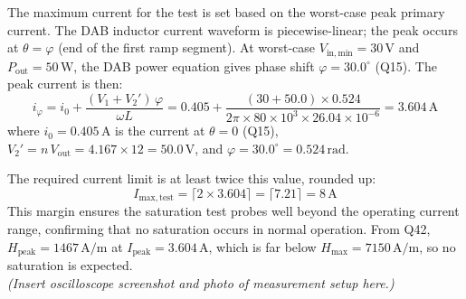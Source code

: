 \documentclass{PELsmallreport}
\begin{document}
\begin{framed}
The maximum current for the test is set based on the worst-case peak primary current. The DAB inductor current waveform is piecewise-linear; the peak occurs at $\theta = \varphi$ (end of the first ramp segment). At worst-case $V_\mathrm{in,min} = 30\,\mathrm{V}$ and $P_\mathrm{out} = 50\,\mathrm{W}$, the DAB power equation gives phase shift $\varphi = 30.0^\circ$ (Q15). The peak current is then:
\begin{equation}
    i_\varphi = i_0 + \frac{(V_1 + V_2')\,\varphi}{\omega L} = 0.405 + \frac{(30 + 50.0)\times0.524}{2\pi\times80\times10^3\times26.04\times10^{-6}} = 3.604\,\mathrm{A}
\end{equation}
where $i_0 = 0.405\,\mathrm{A}$ is the current at $\theta=0$ (Q15), $V_2' = n\,V_\mathrm{out} = 4.167\times12 = 50.0\,\mathrm{V}$, and $\varphi = 30.0^\circ = 0.524\,\mathrm{rad}$.

The required current limit is at least twice this value, rounded up:
\begin{equation}
    I_\mathrm{max,test} = \lceil 2 \times 3.604 \rceil = \lceil 7.21 \rceil = 8\,\mathrm{A}
\end{equation}
This margin ensures the saturation test probes well beyond the operating current range, confirming that no saturation occurs in normal operation. From Q42, $H_\mathrm{peak} = 1467\,\mathrm{A/m}$ at $I_\mathrm{peak} = 3.604\,\mathrm{A}$, which is far below $H_\mathrm{max} = 7150\,\mathrm{A/m}$, so no saturation is expected.\\

\textit{(Insert oscilloscope screenshot and photo of measurement setup here.)}
\end{framed}
\hfill{}
\end{document}
